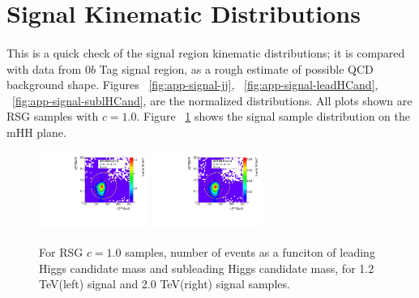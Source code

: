 \section{Signal Kinematic Distributions }
\label{app:signal-dist}

\paragraph{}
This is a quick check of the signal region kinematic distributions; it is compared with data from 0$b$ Tag signal region, as a rough estimate of possible QCD background shape. Figures ~\ref{fig:app-signal-jj}, ~\ref{fig:app-signal-leadHCand}, ~\ref{fig:app-signal-sublHCand}, are the normalized distributions. All plots shown are RSG samples with $c=1.0$. Figure ~\ref{fig:app-signal-mhh} shows the signal sample distribution on the mHH plane.


\begin{figure}[htbp!]
\begin{center}
\includegraphics[angle=270, width=0.32\textwidth]{./figures/boosted/Truth/Sig_1200_AllTag_Incl_mH0H1.pdf}
\includegraphics[angle=270, width=0.32\textwidth]{./figures/boosted/Truth/Sig_2000_AllTag_Incl_mH0H1.pdf}
\caption{For RSG $c=1.0$ samples, number of events as a funciton of leading Higgs candidate mass and subleading Higgs candidate mass, for 1.2 TeV(left) signal and 2.0 TeV(right) signal samples.}
\label{fig:app-signal-mhh}
\end{center}
\end{figure}

